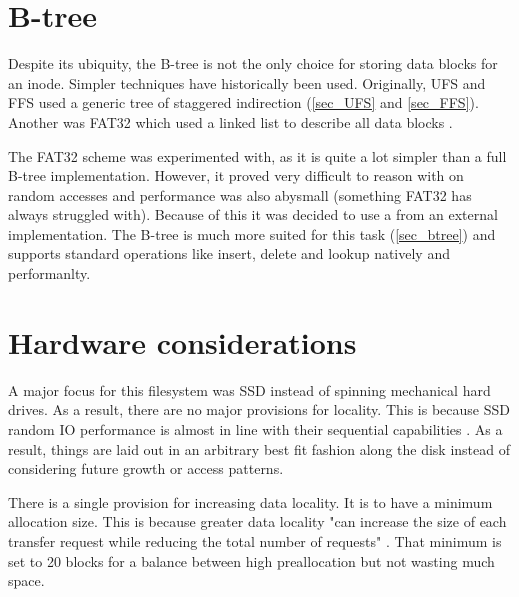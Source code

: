     \section{B-tree}
        \label{sec_design_btree}

        Despite its ubiquity, the B-tree is not the only choice for storing
        data blocks for an inode. Simpler techniques have historically been
        used. Originally, UFS and FFS used a generic tree of staggered
        indirection (\ref{sec_UFS} and \ref{sec_FFS}). Another was FAT32 which
        used a linked list to describe all data blocks \cite{fat32}.

        The FAT32 scheme was experimented with, as it is quite a lot simpler
        than a full B-tree implementation. However, it proved very difficult to
        reason with on random accesses and performance was also abysmall
        (something FAT32 has always struggled with). Because of this it was
        decided to use a \bplustree from an external implementation. The B-tree
        is much more suited for this task (\ref{sec_btree}) and supports
        standard operations like insert, delete and lookup natively and
        performanlty.

    \section{Hardware considerations}
        \label{sec_hardware}

        A major focus for this filesystem was SSD instead of spinning
        mechanical hard drives. As a result, there are no major provisions for
        locality. This is because SSD random IO performance is almost in line
        with their sequential capabilities \cite{servethehome_review}. As a
        result, things are laid out in an arbitrary best fit fashion along the
        disk instead of considering future growth or access patterns.

        There is a single provision for increasing data locality. It is to have
        a minimum allocation size. This is because greater data locality "can
        increase the size of each transfer request while reducing the total
        number of requests" \cite{ext4_docs}. That minimum is set to 20
        blocks for a balance between high preallocation but not wasting much
        space.

